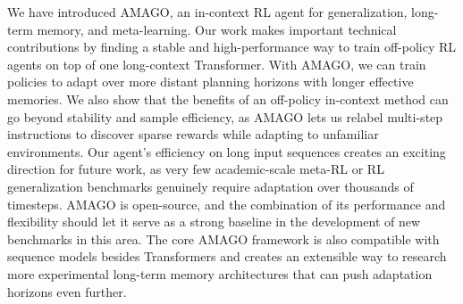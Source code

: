 We have introduced AMAGO, an in-context RL agent for generalization, long-term memory, and meta-learning. Our work makes important technical contributions by finding a stable and high-performance way to train off-policy RL agents on top of one long-context Transformer. With AMAGO, we can train policies to adapt over more distant planning horizons with longer effective memories. We also show that the benefits of an off-policy in-context method can go beyond stability and sample efficiency, as AMAGO lets us relabel multi-step instructions to discover sparse rewards while adapting to unfamiliar environments. Our agent's efficiency on long input sequences creates an exciting direction for future work, as very few academic-scale meta-RL or RL generalization benchmarks genuinely require adaptation over thousands of timesteps. AMAGO is open-source, and the combination of its performance and flexibility should let it serve as a strong baseline in the development of new benchmarks in this area. The core AMAGO framework is also compatible with sequence models besides Transformers and creates an extensible way to research more experimental long-term memory architectures that can push adaptation horizons even further. 

